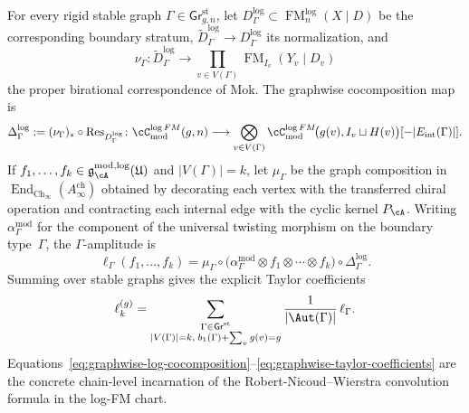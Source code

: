 \begin{construction}
\label{constr:graphwise-log-fm-cocomposition}
For every rigid stable graph $\Gamma\in \mathsf{Gr}^{\mathrm{st}}_{g,n}$, let
$D^{\log}_{\Gamma}\subset \operatorname{FM}^{\log}_n(X\mathbin{|}D)$ be the
corresponding boundary stratum, $\widetilde D^{\log}_{\Gamma}\to D^{\log}_{\Gamma}$
its normalization, and
\[
\nu_\Gamma\colon \widetilde D^{\log}_{\Gamma}\longrightarrow
\prod_{v\in V(\Gamma)}
\operatorname{FM}_{I_v}(Y_v\mathbin{|}D_v)
\]
the proper birational correspondence of Mok.  The graphwise cocomposition map is
\begin{equation}
\label{eq:graphwise-log-cocomposition}
\Delta^{\log}_{\Gamma}
:=
(\nu_\Gamma)_*\circ \operatorname{Res}_{D^{\log}_{\Gamma}}
\colon
\cC^{\log FM}_{\mathrm{mod}}(g,n)
\longrightarrow
\bigotimes_{v\in V(\Gamma)}
\cC^{\log FM}_{\mathrm{mod}}\!\bigl(g(v),I_v\sqcup H(v)\bigr)[-|E_{\mathrm{int}}(\Gamma)|].
\end{equation}
If $f_1,\dots,f_k\in \mathfrak g^{\mathrm{mod,log}}_{\cA}(\mathfrak U)$ and
$|V(\Gamma)|=k$, let $\mu_\Gamma$ be the graph composition in
$\operatorname{End}_{\mathrm{Ch}_\infty}(A^{\mathrm{ch}}_\infty)$ obtained by
decorating each vertex with the transferred chiral operation and
contracting each internal edge with the cyclic kernel $P_\cA$.
Writing $\alpha^{\mathrm{mod}}_\Gamma$ for the component of the universal
twisting morphism on the boundary type~$\Gamma$, the $\Gamma$-amplitude is
\begin{equation}
\label{eq:graphwise-gamma-amplitude}
\ell_\Gamma(f_1,\dots,f_k)
=
\mu_\Gamma\circ
\bigl(\alpha^{\mathrm{mod}}_\Gamma\otimes f_1\otimes\cdots\otimes f_k\bigr)
\circ
\Delta^{\log}_{\Gamma}.
\end{equation}
Summing over stable graphs gives the explicit Taylor coefficients
\begin{equation}
\label{eq:graphwise-taylor-coefficients}
\ell_k^{(g)}
=
\sum_{\substack{
\Gamma\in \mathsf{Gr}^{\mathrm{st}}\\
|V(\Gamma)|=k,\;
b_1(\Gamma)+\sum_v g(v)=g}}
\frac{1}{|\Aut(\Gamma)|}\,
\ell_\Gamma.
\end{equation}
Equations~\eqref{eq:graphwise-log-cocomposition}--\eqref{eq:graphwise-taylor-coefficients}
are the concrete chain-level incarnation of the Robert-Nicoud--Wierstra
convolution formula in the log-FM chart.
\end{construction}

